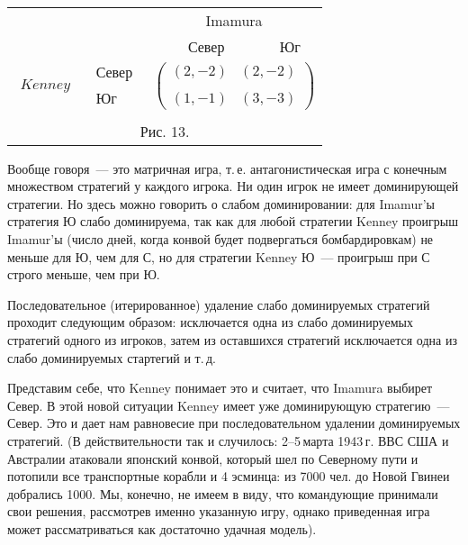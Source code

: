 \documentclass[12pt]{article}
\begin{document}
\begin{center}
\begin{tabular}{cccc}
&&\multicolumn{2}{c}{Imamura}\\
&&\quad\,\, Север& Юг\\
$\begin{array}{c} \\Kenney\\ \end{array}$& $\begin{array}{c} Север\\ \\
Юг \end{array}$& \multicolumn{2}{c}{$\left( \begin{array}{cc}
(2,-2)&(2,-2)\\
\\
(1,-1)&(3,-3)\end{array}\right)$}\\
\multicolumn{4}{c}{}\\
\multicolumn{4}{c}{Рис. 13.}\\
\end{tabular}
\end{center}

Вообще говоря~--- это матричная игра, т.\,е. антагонистическая игра
с конечным множеством стратегий у каждого игрока.  Ни один игрок не
имеет доминирующей стратегии. Но здесь можно говорить о слабом
доминировании: для Imamur'ы стратегия Ю слабо доминируема, так как
для любой стратегии Kenney проигрыш Imamur'ы (число дней, когда
конвой будет подвергаться бомбардировкам) не меньше для Ю, чем для
С, но для стратегии Kenney Ю~--- проигрыш при С строго меньше, чем
при Ю.


Последовательное (итерированное) удаление слабо доминируемых
стратегий проходит следующим образом: исключается одна из слабо
доминируемых стратегий одного из игроков, затем из оставшихся
стратегий исключается одна из слабо доминируемых стартегий и т.\,д.

Представим себе, что Kenney понимает это и считает, что Imamura
выбирет Север.  В этой новой ситуации Kenney имеет уже
доминирующую стратегию~--- Север. Это и дает нам равновесие при
последовательном удалении доминируемых стратегий. (В
действительности так и случилось: 2--5\,марта 1943\,г. ВВС США и
Австралии атаковали японский конвой, который шел по Северному пути
и потопили все транспортные корабли и 4 эсминца: из 7000 чел. до
Новой Гвинеи добрались 1000. Мы, конечно, не имеем в виду, что
командующие принимали свои решения, рассмотрев именно указанную
игру, однако приведенная игра может рассматриваться как достаточно
удачная модель).
\end{document}
